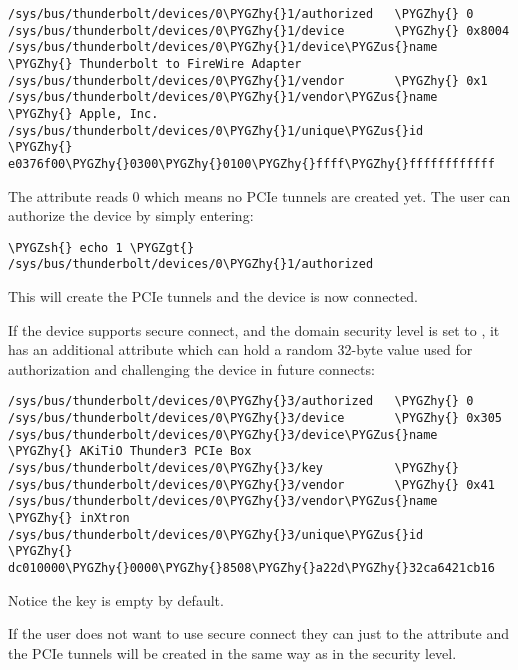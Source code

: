 \documentclass[a4paper,8pt,english]{sphinxmanual}
\def\PYGZus{\char`\_}
\def\PYGZgt{\char`\>}
\def\PYGZsh{\char`\#}
\def\PYGZhy{\char`\-}
\begin{document}
\begin{Verbatim}[commandchars=\\\{\}]
/sys/bus/thunderbolt/devices/0\PYGZhy{}1/authorized   \PYGZhy{} 0
/sys/bus/thunderbolt/devices/0\PYGZhy{}1/device       \PYGZhy{} 0x8004
/sys/bus/thunderbolt/devices/0\PYGZhy{}1/device\PYGZus{}name  \PYGZhy{} Thunderbolt to FireWire Adapter
/sys/bus/thunderbolt/devices/0\PYGZhy{}1/vendor       \PYGZhy{} 0x1
/sys/bus/thunderbolt/devices/0\PYGZhy{}1/vendor\PYGZus{}name  \PYGZhy{} Apple, Inc.
/sys/bus/thunderbolt/devices/0\PYGZhy{}1/unique\PYGZus{}id    \PYGZhy{} e0376f00\PYGZhy{}0300\PYGZhy{}0100\PYGZhy{}ffff\PYGZhy{}ffffffffffff
\end{Verbatim}

The  attribute reads 0 which means no PCIe tunnels are
created yet. The user can authorize the device by simply entering:

\begin{Verbatim}[commandchars=\\\{\}]
\PYGZsh{} echo 1 \PYGZgt{} /sys/bus/thunderbolt/devices/0\PYGZhy{}1/authorized
\end{Verbatim}

This will create the PCIe tunnels and the device is now connected.

If the device supports secure connect, and the domain security level is
set to , it has an additional attribute  which can hold
a random 32-byte value used for authorization and challenging the device in
future connects:

\begin{Verbatim}[commandchars=\\\{\}]
/sys/bus/thunderbolt/devices/0\PYGZhy{}3/authorized   \PYGZhy{} 0
/sys/bus/thunderbolt/devices/0\PYGZhy{}3/device       \PYGZhy{} 0x305
/sys/bus/thunderbolt/devices/0\PYGZhy{}3/device\PYGZus{}name  \PYGZhy{} AKiTiO Thunder3 PCIe Box
/sys/bus/thunderbolt/devices/0\PYGZhy{}3/key          \PYGZhy{}
/sys/bus/thunderbolt/devices/0\PYGZhy{}3/vendor       \PYGZhy{} 0x41
/sys/bus/thunderbolt/devices/0\PYGZhy{}3/vendor\PYGZus{}name  \PYGZhy{} inXtron
/sys/bus/thunderbolt/devices/0\PYGZhy{}3/unique\PYGZus{}id    \PYGZhy{} dc010000\PYGZhy{}0000\PYGZhy{}8508\PYGZhy{}a22d\PYGZhy{}32ca6421cb16
\end{Verbatim}

Notice the key is empty by default.

If the user does not want to use secure connect they can just 
to the  attribute and the PCIe tunnels will be created in
the same way as in the  security level.
\end{document}

